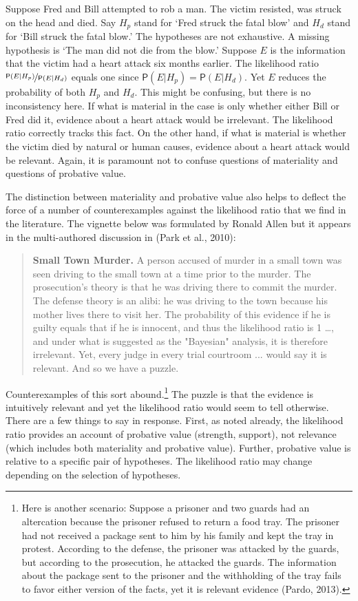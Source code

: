 \documentclass[
  10pt,
  dvipsnames,enabledeprecatedfontcommands]{scrartcl}
\newcommand{\pr}[1]{\mathsf{P}(#1)}
\begin{document}
Suppose Fred and Bill attempted to rob a man. The victim resisted, was
struck on the head and died. Say \(H_p\) stand for `Fred struck the
fatal blow' and \(H_d\) stand for `Bill struck the fatal blow.' The
hypotheses are not exhaustive. A missing hypothesis is `The man did not
die from the blow.' Suppose \(E\) is the information that the victim had
a heart attack six months earlier. The likelihood ratio
\(\nicefrac{\pr{E \vert H_p}}{\pr{E \vert H_d}}\) equals one since
\(\pr{E\vert H_p}=\pr{E\vert H_d}\). Yet \(E\) reduces the probability
of both \(H_p\) and \(H_d\). This might be confusing, but there is no
inconsistency here. If what is material in the case is only whether
either Bill or Fred did it, evidence about a heart attack would be
irrelevant. The likelihood ratio correctly tracks this fact. On the
other hand, if what is material is whether the victim died by natural or
human causes, evidence about a heart attack would be relevant. Again, it
is paramount not to confuse questions of materiality and questions of
probative value.

The distinction between materiality and probative value also helps to
deflect the force of a number of counterexamples against the likelihood
ratio that we find in the literature. The vignette below was formulated
by Ronald Allen but it appears in the multi-authored discussion in (Park
et al., 2010):

\begin{quote}
    \textbf{Small Town Murder.} A person accused of murder in a small town was seen driving to the small town at a time prior to the murder. The prosecution's theory is that he was driving there to commit the murder. The defense theory is an alibi: he was driving to the town because his mother lives there to visit her. The probability of this evidence if he is guilty equals that if he is innocent, and thus the likelihood ratio is 1 \dots , and under what is suggested as the "Bayesian" analysis, it is therefore irrelevant. 
    Yet, every judge in every trial courtroom ... would say it is relevant.  And so we have a puzzle.  
    \end{quote}

\noindent  Counterexamples of this sort abound.\footnote{Here is another
  scenario: Suppose a prisoner and two guards had an altercation because
  the prisoner refused to return a food tray. The prisoner had not
  received a package sent to him by his family and kept the tray in
  protest. According to the defense, the prisoner was attacked by the
  guards, but according to the prosecution, he attacked the guards. The
  information about the package sent to the prisoner and the withholding
  of the tray fails to favor either version of the facts, yet it is
  relevant evidence (Pardo, 2013).} The puzzle is that the evidence is
intuitively relevant and yet the likelihood ratio would seem to tell
otherwise. There are a few things to say in response. First, as noted
already, the likelihood ratio provides an account of probative value
(strength, support), not relevance (which includes both materiality and
probative value). Further, probative value is relative to a specific
pair of hypotheses. The likelihood ratio may change depending on the
selection of hypotheses.
\end{document}
